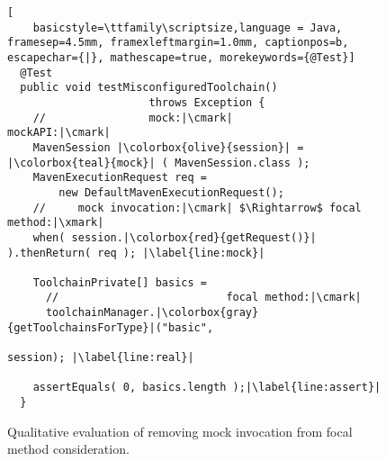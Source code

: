 \begin{figure}[h]
	\begin{lstlisting}[
	basicstyle=\ttfamily\scriptsize,language = Java, framesep=4.5mm, framexleftmargin=1.0mm, captionpos=b, escapechar={|}, mathescape=true, morekeywords={@Test}]
  @Test
  public void testMisconfiguredToolchain() 
                      throws Exception {
    //                mock:|\cmark|         mockAPI:|\cmark|
    MavenSession |\colorbox{olive}{session}| = |\colorbox{teal}{mock}| ( MavenSession.class );
    MavenExecutionRequest req =
        new DefaultMavenExecutionRequest();
    //     mock invocation:|\cmark| $\Rightarrow$ focal method:|\xmark|
    when( session.|\colorbox{red}{getRequest()}| ).thenReturn( req ); |\label{line:mock}|

    ToolchainPrivate[] basics =
      //                          focal method:|\cmark|
      toolchainManager.|\colorbox{gray}{getToolchainsForType}|("basic", 
                                                           session); |\label{line:real}|

    assertEquals( 0, basics.length );|\label{line:assert}|
  }
  \end{lstlisting}

  \caption{Qualitative evaluation of removing mock invocation from focal method consideration.}
  \label{fig:mockExampleEvaluation}
\end{figure}
